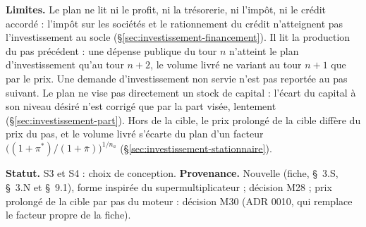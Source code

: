 \documentclass[11pt,a4paper]{article}
\newcommand{\limites}{\par\noindent\textbf{Limites.} }
\begin{document}
\begin{proposee}
\limites Le plan ne lit ni le profit, ni la trésorerie, ni l'impôt, ni le crédit accordé : l'impôt sur les sociétés et le rationnement du crédit n'atteignent pas l'investissement au socle (\S\ref{sec:investissement-financement}). Il lit la production du pas précédent : une dépense publique du tour $n$ n'atteint le plan d'investissement qu'au tour $n + 2$, le volume livré ne variant au tour $n + 1$ que par le prix. Une demande d'investissement non servie n'est pas reportée au pas suivant. Le plan ne vise pas directement un stock de capital : l'écart du capital à son niveau désiré n'est corrigé que par la part visée, lentement (\S\ref{sec:investissement-part}). Hors de la cible, le prix prolongé de la cible diffère du prix du pas, et le volume livré s'écarte du plan d'un facteur $\bigl((1 + \pi^\ast)/(1 + \bar\pi)\bigr)^{1/n_a}$ (\S\ref{sec:investissement-stationnaire}).

\textbf{Statut.} S3 et S4 : choix de conception. \textbf{Provenance.} Nouvelle (fiche, \S~3.S, \S~3.N et \S~9.1), forme inspirée du supermultiplicateur ; décision M28 ; prix prolongé de la cible par pas du moteur : décision M30 (ADR 0010, qui remplace le facteur propre de la fiche).
\end{proposee}
\end{document}
